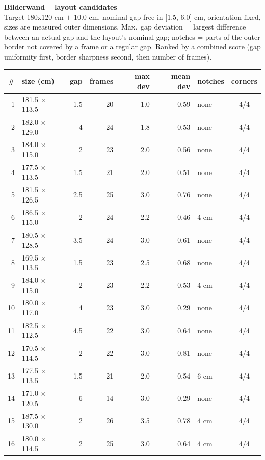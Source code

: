 \documentclass[a4paper,landscape,10pt]{article}
\begin{document}
{\LARGE\bfseries Bilderwand -- layout candidates}\\[4pt]
{\small Target 180x120 cm $\pm$ 10.0 cm, nominal gap free in
[1.5, 6.0] cm, orientation fixed, sizes are measured outer dimensions.
Max.\ gap deviation = largest difference between an actual gap and the layout's nominal gap;
notches = parts of the outer border not covered by a frame or a regular gap. Ranked by a combined
score (gap uniformity first, border sharpness second, then number of frames).}\\[10pt]
\begin{minipage}[t]{0.6\textwidth}\vspace{0pt}
\begin{tabular}{@{}r l r r r r l c@{}}
\toprule
\# & size (cm) & gap & frames & max dev & mean dev & notches & corners \\
\midrule
1 & 181.5 $\times$ 113.5 & 1.5 & 20 & 1.0 & 0.59 & none & 4/4 \\
2 & 182.0 $\times$ 129.0 & 4 & 24 & 1.8 & 0.53 & none & 4/4 \\
3 & 184.0 $\times$ 115.0 & 2 & 23 & 2.0 & 0.56 & none & 4/4 \\
4 & 177.5 $\times$ 113.5 & 1.5 & 21 & 2.0 & 0.51 & none & 4/4 \\
5 & 181.5 $\times$ 126.5 & 2.5 & 25 & 3.0 & 0.76 & none & 4/4 \\
6 & 186.5 $\times$ 115.0 & 2 & 24 & 2.2 & 0.46 & 4 cm & 4/4 \\
7 & 180.5 $\times$ 128.5 & 3.5 & 24 & 3.0 & 0.61 & none & 4/4 \\
8 & 169.5 $\times$ 113.5 & 1.5 & 23 & 2.5 & 0.68 & none & 4/4 \\
9 & 184.0 $\times$ 115.0 & 2 & 23 & 2.2 & 0.53 & 4 cm & 4/4 \\
10 & 180.0 $\times$ 117.0 & 4 & 23 & 3.0 & 0.29 & none & 4/4 \\
11 & 182.5 $\times$ 112.5 & 4.5 & 22 & 3.0 & 0.64 & none & 4/4 \\
12 & 170.5 $\times$ 114.5 & 2 & 22 & 3.0 & 0.81 & none & 4/4 \\
13 & 177.5 $\times$ 113.5 & 1.5 & 21 & 2.0 & 0.54 & 6 cm & 4/4 \\
14 & 171.0 $\times$ 120.5 & 6 & 14 & 3.0 & 0.29 & none & 4/4 \\
15 & 187.5 $\times$ 130.0 & 2 & 26 & 3.5 & 0.78 & 4 cm & 4/4 \\
16 & 180.0 $\times$ 114.5 & 2 & 25 & 3.0 & 0.64 & 4 cm & 4/4 \\
\bottomrule
\end{tabular}
\end{minipage}\hfill
\end{document}
